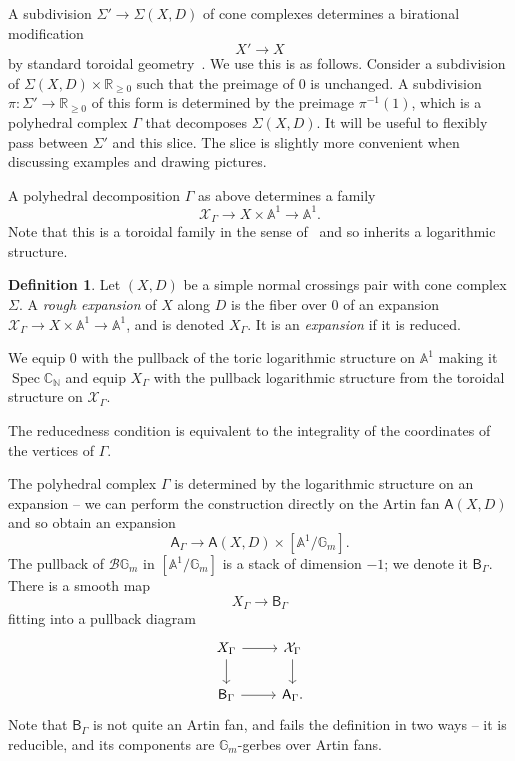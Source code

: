 \documentclass[11pt]{amsart}
\theoremstyle{definition}
\theoremstyle{definition}
\newtheorem{definition}[theorem]{Definition}
\newcommand{\RR}{\mathbb{R}}
\newcommand{\Spec}{\operatorname{Spec}}
\begin{document}
A subdivision $\Sigma'\to \Sigma(X,D)$ of cone complexes determines a birational modification
\[
X'\to X
\]
by standard toroidal geometry~\cite{KKMSD}. We use this is as follows. Consider a subdivision of $\Sigma(X,D) \times\mathbb R_{\geq 0}$ such that the preimage of $0$ is unchanged. A subdivision $\pi\colon \Sigma'\to\RR_{\geq 0}$ of this form is determined by the preimage $\pi^{-1}(1)$, which is a polyhedral complex $\Gamma$ that decomposes $\Sigma(X,D)$. It will be useful to flexibly pass between $\Sigma'$ and this slice. The slice is slightly more convenient when discussing examples and drawing pictures. 

A polyhedral decomposition $\Gamma$ as above determines a family 
$$\mathcal X_\Gamma\to X\times\mathbb A^1\to \mathbb A^1.$$ 
Note that this is a toroidal family in the sense of~\cite{KKMSD} and so inherits a logarithmic structure. 

\begin{definition}
Let $(X,D)$ be a simple normal crossings pair with cone complex $\Sigma$. A {\it rough expansion} of $X$ along $D$ is the fiber over $0$ of an expansion $\mathcal X_\Gamma\to X\times\mathbb A^1\to \mathbb A^1$, and is denoted $X_\Gamma$. It is an {\it expansion} if it is reduced. 

We equip $0$ with the pullback of the toric logarithmic structure on $\mathbb A^1$ making it $\Spec \mathbb C_{\mathbb N}$ and equip $X_\Gamma$ with the pullback logarithmic structure from the toroidal structure on $\mathcal X_\Gamma$. 
\end{definition}

The reducedness condition is equivalent to the integrality of the coordinates of the vertices of $\Gamma$. 

The polyhedral complex $\Gamma$ is determined by the logarithmic structure on an expansion -- we can perform the construction directly on the Artin fan $\mathsf A(X,D)$ and so obtain an expansion
\[
\mathsf A_\Gamma\to\mathsf A(X,D)\times[\mathbb A^1/\mathbb G_m].
\]
The pullback of $\mathcal B\mathbb G_m$ in $[\mathbb A^1/\mathbb G_m]$ is a stack of dimension $-1$; we denote it $\mathsf B_\Gamma$. There is a smooth map
\[
X_\Gamma\to \mathsf B_\Gamma
\]
fitting into a pullback diagram 
\[
\begin{tikzcd}
X_\Gamma\arrow{r}\arrow{d} & \mathcal X_\Gamma\arrow{d}\\
\mathsf B_\Gamma\arrow{r} & \mathsf A_\Gamma.
\end{tikzcd}
\]
Note that $\mathsf B_\Gamma$ is not quite an Artin fan, and fails the definition in two ways -- it is reducible, and its components are $\mathbb G_m$-gerbes over Artin fans. 
\end{document}
